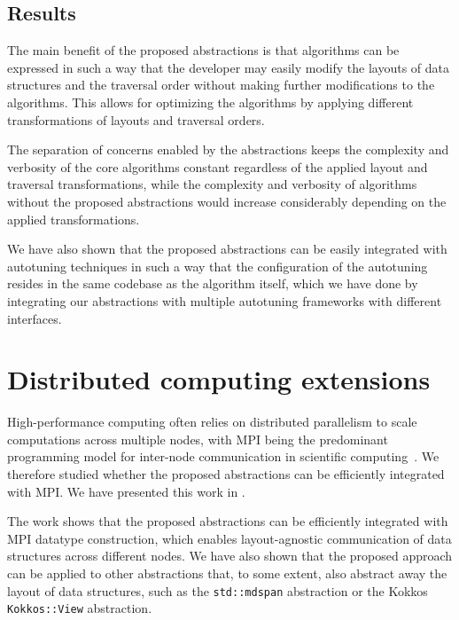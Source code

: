 \subsection{Results}\label{sec:abstractions-results}

The main benefit of the proposed abstractions is that algorithms can be expressed in such a way that the developer may easily modify the layouts of data structures and the traversal order without making further modifications to the algorithms. This allows for optimizing the algorithms by applying different transformations of layouts and traversal orders.

The separation of concerns enabled by the abstractions keeps the complexity and verbosity of the core algorithms constant regardless of the applied layout and traversal transformations, while the complexity and verbosity of algorithms without the proposed abstractions would increase considerably depending on the applied transformations.

We have also shown that the proposed abstractions can be easily integrated with autotuning techniques in such a way that the configuration of the autotuning resides in the same codebase as the algorithm itself, which we have done by integrating our abstractions with multiple autotuning frameworks with different interfaces.


\section{Distributed computing extensions}\label{sec:layout-agnostic}

High-performance computing often relies on distributed parallelism to scale computations across multiple nodes, with MPI being the predominant programming model for inter-node communication in scientific computing~\cite{mpi-5.0,laguna2019large}. We therefore studied whether the proposed abstractions can be efficiently integrated with MPI. We have presented this work in .

The work shows that the proposed abstractions can be efficiently integrated with MPI datatype construction, which enables layout-agnostic communication of data structures across different nodes. We have also shown that the proposed approach can be applied to other abstractions that, to some extent, also abstract away the layout of data structures, such as the \cpp \lstinline{std::mdspan} abstraction or the Kokkos \lstinline{Kokkos::View} abstraction.

